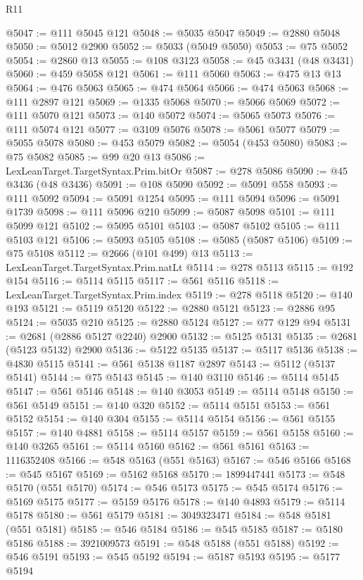 \begin{lexlean}{R11}
\begin{coremodule}
{{{{{{{{{{{{{{{{{{{{{{{{{{{{{{{{{{{{{{{{{{{{{{{{{{{{{{{{{{{{{{{{{{{{{{{{{{{{{{{{{{@5047 := @111 @5045 @121
@5048 := @5035 @5047
@5049 := @2880 @5048
@5050 := @5012 @2900
@5052 := @5033 (@5049 @5050)
@5053 := @75 @5052
@5054 := @2860 @13
@5055 := @108 @3123
@5058 := @45 @3431 (@48 @3431)
@5060 := @459 @5058 @121
@5061 := @111 @5060
@5063 := @475 @13 @13
@5064 := @476 @5063
@5065 := @474 @5064
@5066 := @474 @5063
@5068 := @111 @2897 @121
@5069 := @1335 @5068
@5070 := @5066 @5069
@5072 := @111 @5070 @121
@5073 := @140 @5072
@5074 := @5065 @5073
@5076 := @111 @5074 @121
@5077 := @3109 @5076
@5078 := @5061 @5077
@5079 := @5055 @5078
@5080 := @453 @5079
@5082 := @5054 (@453 @5080)
@5083 := @75 @5082
@5085 := @99 @20 @13
@5086 := LexLeanTarget.TargetSyntax.Prim.bitOr
@5087 := @278 @5086
@5090 := @45 @3436 (@48 @3436)
@5091 := @108 @5090
@5092 := @5091 @558
@5093 := @111 @5092
@5094 := @5091 @1254
@5095 := @111 @5094
@5096 := @5091 @1739
@5098 := @111 @5096 @210
@5099 := @5087 @5098
@5101 := @111 @5099 @121
@5102 := @5095 @5101
@5103 := @5087 @5102
@5105 := @111 @5103 @121
@5106 := @5093 @5105
@5108 := @5085 (@5087 @5106)
@5109 := @75 @5108
@5112 := @2666 (@101 @499) @13
@5113 := LexLeanTarget.TargetSyntax.Prim.natLt
@5114 := @278 @5113
@5115 := @192 @154
@5116 := @5114 @5115
@5117 := @561 @5116
@5118 := LexLeanTarget.TargetSyntax.Prim.index
@5119 := @278 @5118
@5120 := @140 @193
@5121 := @5119 @5120
@5122 := @2880 @5121
@5123 := @2886 @95
@5124 := @5035 @210
@5125 := @2880 @5124
@5127 := @77 @129 @94
@5131 := @2681 (@2886 @5127 @2240) @2900
@5132 := @5125 @5131
@5135 := @2681 (@5123 @5132) @2900
@5136 := @5122 @5135
@5137 := @5117 @5136
@5138 := @4830 @5115
@5141 := @561 @5138 @1187 @2897
@5143 := @5112 (@5137 @5141)
@5144 := @75 @5143
@5145 := @140 @3110
@5146 := @5114 @5145
@5147 := @561 @5146
@5148 := @140 @3053
@5149 := @5114 @5148
@5150 := @561 @5149
@5151 := @140 @320
@5152 := @5114 @5151
@5153 := @561 @5152
@5154 := @140 @304
@5155 := @5114 @5154
@5156 := @561 @5155
@5157 := @140 @4881
@5158 := @5114 @5157
@5159 := @561 @5158
@5160 := @140 @3265
@5161 := @5114 @5160
@5162 := @561 @5161
@5163 := 1116352408
@5166 := @548 @5163 (@551 @5163)
@5167 := @546 @5166
@5168 := @545 @5167
@5169 := @5162 @5168
@5170 := 1899447441
@5173 := @548 @5170 (@551 @5170)
@5174 := @546 @5173
@5175 := @545 @5174
@5176 := @5169 @5175
@5177 := @5159 @5176
@5178 := @140 @4893
@5179 := @5114 @5178
@5180 := @561 @5179
@5181 := 3049323471
@5184 := @548 @5181 (@551 @5181)
@5185 := @546 @5184
@5186 := @545 @5185
@5187 := @5180 @5186
@5188 := 3921009573
@5191 := @548 @5188 (@551 @5188)
@5192 := @546 @5191
@5193 := @545 @5192
@5194 := @5187 @5193
@5195 := @5177 @5194
}}}}}}}}}}}}}}}}}}}}}}}}}}}}}}}}}}}}}}}}}}}}}}}}}}}}}}}}}}}}}}}}}}}}}}}}}}}}}}}}}}
\end{coremodule}
\end{lexlean}
